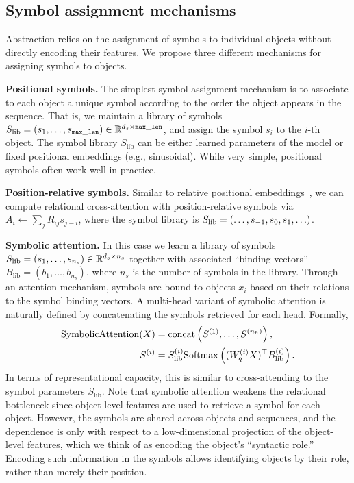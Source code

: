 \subsection{Symbol assignment mechanisms}\label{ssec:symbol_assignment}
Abstraction relies on the assignment of symbols to individual objects without directly encoding their features. We propose three different mechanisms for assigning symbols to objects. 

\textbf{Positional symbols.} The simplest symbol assignment mechanism is to  associate to each object a unique symbol according to the order the object appears in the sequence. That is, we maintain a library of symbols $S_{\mathrm{lib}} = (s_1, \ldots, s_{\mathtt{max\_len}}) \in \mathbb{R}^{d_s \times \mathtt{max\_len}}$, and assign the symbol $s_i$ to the $i$-th object. The symbol library $S_\mathrm{lib}$ can be either learned parameters of the model or fixed positional embeddings (e.g., sinusoidal). While very simple, positional symbols often work well in practice.

\textbf{Position-relative symbols.} Similar to relative positional embeddings~\citep{shaw2018self,kazemnejadImpactPositionalEncoding2023}, we can compute relational cross-attention with position-relative symbols via $A_i \gets \sum_j R_{ij} s_{j-i}$, where the symbol library is $S_{\mathrm{lib}} = \left(\ldots, s_{-1}, s_0, s_1, \ldots\right)$.

\textbf{Symbolic attention.} In this case we learn a library of symbols $S_{\mathrm{lib}} = (s_1, \ldots, s_{n_s}) \in \mathbb{R}^{d_s \times n_s}$ together with associated ``binding vectors'' $B_{\mathrm{lib}} = (b_1, \ldots, b_{n_s})$, where $n_s$ is the number of symbols in the library. Through an attention mechanism, symbols are bound to objects $x_i$ based on their relations to the symbol binding vectors. A multi-head variant of symbolic attention is naturally  defined by concatenating the symbols retrieved for each head. Formally, 
\begin{equation}
    \begin{split}
        \mathrm{SymbolicAttention}(X) &= \mathrm{concat}\left(S^{(1)}, \ldots, S^{(n_h)}\right), \\
        S^{(i)} &= S_{\mathrm{lib}}^{(i)} \mathrm{Softmax} \left((W_q^{(i)} X)^\top B_{\mathrm{lib}}^{(i)}\right).
    \end{split}
\end{equation}
In terms of representational capacity, this is similar to cross-attending to the symbol parameters $S_{\mathrm{lib}}$.
Note that symbolic attention weakens the relational bottleneck since object-level features are used to retrieve a symbol for each object. However, 
the symbols are shared across objects and sequences, and the dependence is only with respect to a low-dimensional projection of the object-level features, which we think of as encoding the object's ``syntactic role.'' Encoding such information in the symbols allows identifying objects by their role, rather than merely their position.


